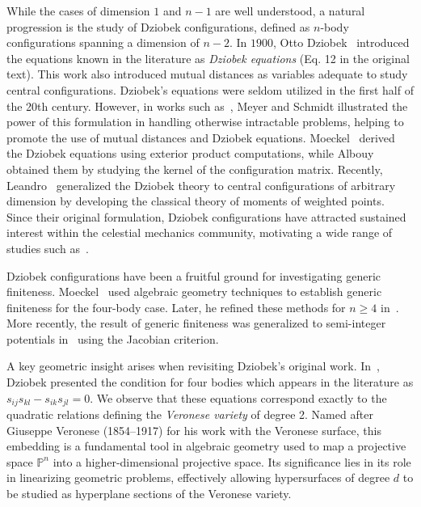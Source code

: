 \documentclass{amsart}
\theoremstyle{definition}
\theoremstyle{remark}
\numberwithin{equation}{section}
\begin{document}
While the cases of dimension $1$ and $n-1$ are well understood, a natural progression is the study of Dziobek configurations, defined as $n$-body configurations spanning a dimension of $n-2$. In $1900$, Otto Dziobek~\cite{dziobek1900ueber} introduced the equations known in the literature as \emph{Dziobek equations} (Eq. 12 in the original text). This work also introduced mutual distances as variables adequate to study central configurations. Dziobek's equations were seldom utilized in the first half of the 20th century. However, in works such as~\cite{meyer1988bifurcations}, Meyer and Schmidt illustrated the power of this formulation in handling otherwise intractable problems, helping to promote the use of mutual distances and Dziobek equations. Moeckel~\cite{moeckel2001generic} derived the Dziobek equations using exterior product computations, while Albouy~\cite{albouy2003paper} obtained them by studying the kernel of the configuration matrix. Recently, Leandro~\cite{leandro2025moments} generalized the Dziobek theory to central configurations of arbitrary dimension by developing the classical theory of moments of weighted points. Since their original formulation, Dziobek configurations have attracted sustained interest within the celestial mechanics community, motivating a wide range of studies such as~\cite{albouy2008symmetry, almeida2004dziobek,  leandro2003finiteness, llibre2015note, macmillan1932permanent,   santos2023bifurcations}.

Dziobek configurations have been a fruitful ground for investigating generic finiteness. Moeckel~\cite{moeckel1985relative} used algebraic geometry techniques to establish generic finiteness for the four-body case. Later, he refined these methods for $n \geq 4$ in~\cite{moeckel2001generic}. More recently, the result of generic finiteness was generalized to semi-integer potentials in~\cite{dias2017new} using the Jacobian criterion.

A key geometric insight arises when revisiting Dziobek's original work. In~\cite{dziobek1900ueber}, Dziobek presented the condition for four bodies which appears in the literature as $s_{ij}s_{kl}-s_{ik}s_{jl} = 0$. We observe that these equations correspond exactly to the quadratic relations defining the \emph{Veronese variety} of degree 2. Named after Giuseppe Veronese (1854--1917) for his work with the Veronese surface, this embedding is a fundamental tool in algebraic geometry used to map a projective space $\mathbb{P}^{n}$ into a higher-dimensional projective space. Its significance lies in its role in linearizing geometric problems, effectively allowing hypersurfaces of degree $d$ to be studied as hyperplane sections of the Veronese variety.
\end{document}
